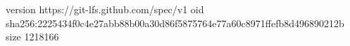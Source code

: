 version https://git-lfs.github.com/spec/v1
oid sha256:2225434f0c4e27abb88b00a30d86f5875764e77a60c8971ffefb8d496890212b
size 1218166
